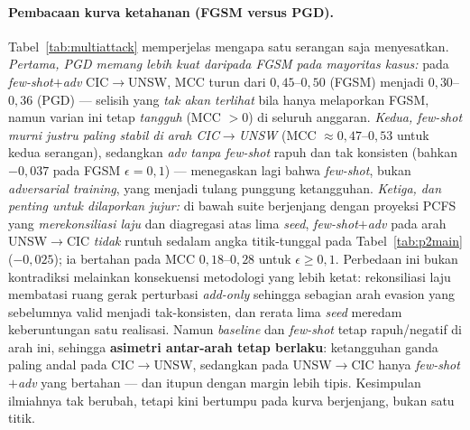 \documentclass[11pt,a4paper]{article}
\begin{document}
\paragraph{Pembacaan kurva ketahanan (FGSM versus PGD).} Tabel~\ref{tab:multiattack}
memperjelas mengapa satu serangan saja menyesatkan. \emph{Pertama, PGD memang lebih
kuat daripada FGSM pada mayoritas kasus:} pada \emph{few-shot$+$adv}
CIC$\rightarrow$UNSW, MCC turun dari $0{,}45$--$0{,}50$ (FGSM) menjadi
$0{,}30$--$0{,}36$ (PGD) --- selisih yang \emph{tak akan terlihat} bila hanya
melaporkan FGSM, namun varian ini tetap \emph{tangguh} (MCC $>0$) di seluruh
anggaran. \emph{Kedua, few-shot murni justru paling stabil di arah
CIC$\rightarrow$UNSW} (MCC $\approx 0{,}47$--$0{,}53$ untuk kedua serangan),
sedangkan \emph{adv tanpa few-shot} rapuh dan tak konsisten (bahkan $-0{,}037$ pada
FGSM $\epsilon{=}0{,}1$) --- menegaskan lagi bahwa \emph{few-shot}, bukan
\emph{adversarial training}, yang menjadi tulang punggung ketangguhan.
\emph{Ketiga, dan penting untuk dilaporkan jujur:} di bawah suite berjenjang
dengan proyeksi PCFS yang \emph{merekonsiliasi laju} dan diagregasi atas lima
\emph{seed}, \emph{few-shot$+$adv} pada arah UNSW$\rightarrow$CIC \emph{tidak}
runtuh sedalam angka titik-tunggal pada Tabel~\ref{tab:p2main} ($-0{,}025$);
ia bertahan pada MCC $0{,}18$--$0{,}28$ untuk $\epsilon\ge0{,}1$. Perbedaan ini
bukan kontradiksi melainkan konsekuensi metodologi yang lebih ketat: rekonsiliasi
laju membatasi ruang gerak perturbasi \emph{add-only} sehingga sebagian arah evasion
yang sebelumnya valid menjadi tak-konsisten, dan rerata lima \emph{seed} meredam
keberuntungan satu realisasi. Namun \emph{baseline} dan \emph{few-shot} tetap
rapuh/negatif di arah ini, sehingga \textbf{asimetri antar-arah tetap berlaku}:
ketangguhan ganda paling andal pada CIC$\rightarrow$UNSW, sedangkan pada
UNSW$\rightarrow$CIC hanya \emph{few-shot$+$adv} yang bertahan --- dan itupun dengan
margin lebih tipis. Kesimpulan ilmiahnya tak berubah, tetapi kini bertumpu pada
kurva berjenjang, bukan satu titik.
\end{document}
